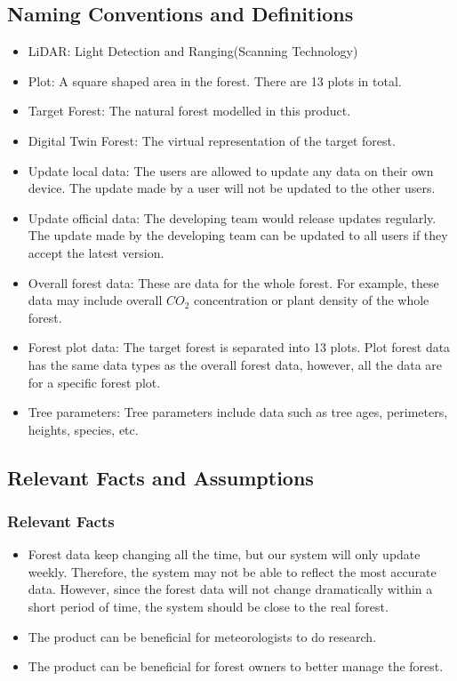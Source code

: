 \documentclass{article}
\begin{document}
\subsection{Naming Conventions and Definitions}
\begin{itemize}
    \item LiDAR: Light Detection and Ranging(Scanning Technology)
    \item Plot: A square shaped area in the forest. There are 13 plots in total. 
    \item Target Forest: The natural forest modelled in this product.
    \item Digital Twin Forest: The virtual representation of the target forest.
    \item Update local data: The users are allowed to update any data on their own device. The update made by a user will not be updated to the other users.
    \item Update official data: The developing team would release updates regularly. The update made by the developing team can be updated to all users if they accept the latest version.
    \item Overall forest data: These are data for the whole forest. For example,
    these data may include overall $CO_2$ concentration or plant density of the whole
    forest.
    \item Forest plot data: The target forest is separated into 13 plots. Plot forest
    data
    has the same data types as the overall forest data, however, all the data are for
    a specific forest plot.
    \item Tree parameters: Tree parameters include data such as tree ages,
    perimeters,
    heights, species, etc.
\end{itemize}

\subsection{Relevant Facts and Assumptions}
\subsubsection{Relevant Facts}
\begin{itemize}
    \item Forest data keep changing all the time, but our 
    system will only update weekly. Therefore, the 
    system may not be able to reflect the most accurate data. 
    However, since the forest data will not change dramatically
    within a short period of time, the system should be 
    close to the real forest.
    \item The product can be beneficial for meteorologists to do research.
    \item The product can be beneficial for forest owners 
    to better manage the forest.
\end{itemize}
\end{document}
